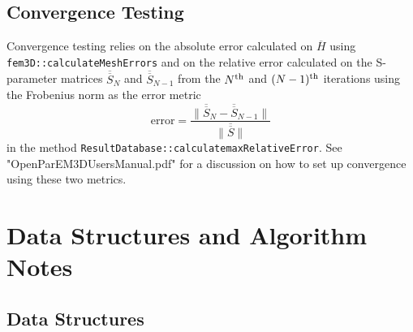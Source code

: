 \documentclass[titlepage]{article}
\renewcommand\_{\textunderscore\linebreak[1]}
\begin{document}
\subsection{Convergence Testing}

Convergence testing relies on the absolute error calculated on $\overline{H}$ using \texttt{fem3D::calculateMeshErrors} and on the relative error calculated on the S-parameter matrices $\overline{\overline{S}}_N$ and $\overline{\overline{S}}_{N-1}$ from the $N^{\textnormal{th}}$ and $(N-1)^{\textnormal{th}}$ iterations using the Frobenius norm as the error metric
\begin{equation}
\text{error}=\frac{\|\overline{\overline{S}}_N-\overline{\overline{S}}_{N-1}\|}{\|\overline{\overline{S}}\|}
\end{equation}
in the method \texttt{ResultDatabase::calculate\_maxRelativeError}.  See "OpenParEM3D\_Users\_Manual.pdf" for a discussion on how to set up convergence using these two metrics.

\section{Data Structures and Algorithm Notes}

\subsection{Data Structures}
\end{document}
